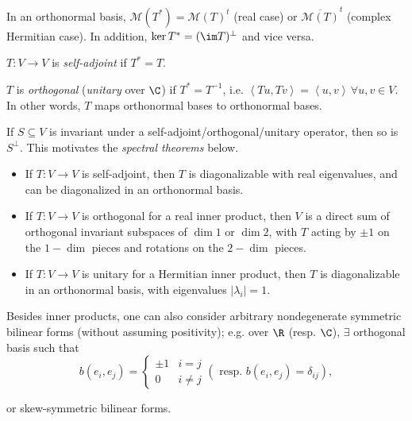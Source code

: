 \documentclass{notes}
\begin{document}
\begin{fact}
    In an orthonormal basis, $\mathcal{M} (T^*)=\mathcal{M} (T)^t$ (real case) or $\overline{\mathcal{M} (T)}^t$ (complex Hermitian case). In addition, $\ker T^{*}=(\im T)^{\perp}$ and vice versa.
\end{fact}

\begin{defn}
    $T\colon V \to V $ is \emph{self-adjoint} if $T^*=T$.
\end{defn}

\begin{defn}
    $T$ is \emph{orthogonal} (\emph{unitary} over $\C $) if $T^*=T^{-1}$, i.e. $\left\langle Tu,Tv \right\rangle=\left\langle u,v \right\rangle\,\forall u,v\in V$. In other words, $T$ maps orthonormal bases to orthonormal bases.
\end{defn}

\begin{remark}
    If $S\subseteq V$ is invariant under a self-adjoint/orthogonal/unitary operator, then so is $S^{\perp}$. This motivates the \emph{spectral theorems} below.
\end{remark}

\begin{theorem}
    \begin{itemize}
        \item If $T\colon V \to V $ is self-adjoint, then $T$ is diagonalizable with real eigenvalues, and can be diagonalized in an orthonormal basis.
        \item If $T\colon V \to V $ is orthogonal for a real inner product, then $V$ is a direct sum  of orthogonal invariant subspaces of $\dim 1$ or $\dim 2$, with $T$ acting by $\pm 1$ on the $1-\dim $ pieces and rotations on the $2-\dim $ pieces.
        \item If $T\colon V \to V $ is unitary for a Hermitian inner product, then $T$ is diagonalizable in an orthonormal basis, with eigenvalues $|\lambda _i|=1$.
    \end{itemize}
\end{theorem}

\begin{digression}
    Besides inner products, one can also consider arbitrary nondegenerate symmetric bilinear forms (without assuming positivity); e.g. over $\R $ (resp. $\C $), $\exists $ orthogonal basis such that
    \[
        b(e_i,e_j)=\begin{cases}
            \pm 1 & i=j\\
            0 & i\neq j
        \end{cases}
        \left( \text{ resp. } b(e_i,e_j)=\delta_{ij} \right) 
    ,\] 

    or skew-symmetric bilinear forms.
\end{digression}
\end{document}
